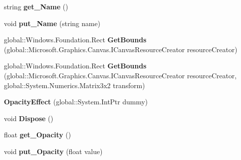 \begin{DoxyCompactItemize}
string {\bfseries get\+\_\+\+Name} ()
\item 
\mbox{\label{class_microsoft_1_1_graphics_1_1_canvas_1_1_effects_1_1_opacity_effect_a56f86cc24fb695fa3d599c2da53fb6d5}} 
void {\bfseries put\+\_\+\+Name} (string name)
\item 
\mbox{\label{class_microsoft_1_1_graphics_1_1_canvas_1_1_effects_1_1_opacity_effect_a8bf0901a94b4839c766e269bfa8a8549}} 
global\+::\+Windows.\+Foundation.\+Rect {\bfseries Get\+Bounds} (global\+::\+Microsoft.\+Graphics.\+Canvas.\+I\+Canvas\+Resource\+Creator resource\+Creator)
\item 
\mbox{\label{class_microsoft_1_1_graphics_1_1_canvas_1_1_effects_1_1_opacity_effect_ae3afb2721cc2938d2730bfcfdab779d2}} 
global\+::\+Windows.\+Foundation.\+Rect {\bfseries Get\+Bounds} (global\+::\+Microsoft.\+Graphics.\+Canvas.\+I\+Canvas\+Resource\+Creator resource\+Creator, global\+::\+System.\+Numerics.\+Matrix3x2 transform)
\item 
\mbox{\label{class_microsoft_1_1_graphics_1_1_canvas_1_1_effects_1_1_opacity_effect_a637fb4e2ccc14281dc718c4623e0343c}} 
{\bfseries Opacity\+Effect} (global\+::\+System.\+Int\+Ptr dummy)
\item 
\mbox{\label{class_microsoft_1_1_graphics_1_1_canvas_1_1_effects_1_1_opacity_effect_a1246fe8a73f548e85044aa9a5849aabc}} 
void {\bfseries Dispose} ()
\item 
\mbox{\label{class_microsoft_1_1_graphics_1_1_canvas_1_1_effects_1_1_opacity_effect_a3a7a9f455303d589535bffc1fbff1ed7}} 
float {\bfseries get\+\_\+\+Opacity} ()
\item 
\mbox{\label{class_microsoft_1_1_graphics_1_1_canvas_1_1_effects_1_1_opacity_effect_a12edc59773ce19245163b1e4f33ab94a}} 
void {\bfseries put\+\_\+\+Opacity} (float value)

\end{DoxyCompactItemize}
